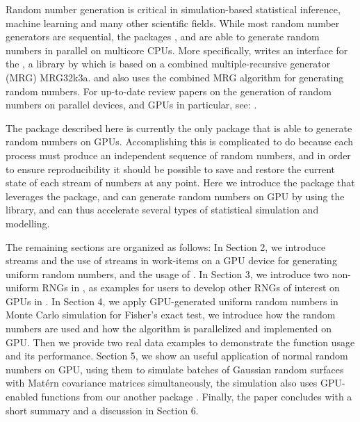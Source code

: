 \documentclass[article,nojss]{jss}\usepackage[]{graphicx}\usepackage[]{color}
\newcommand{\fct}[1]{\code{#1()}}
\begin{document}
Random number generation is critical in simulation-based statistical inference, machine learning and many other scientific fields. While most random number generators are sequential, the  packages ,  \citep*{future1.19.1} and  \citep{sevcikova2015package} are able to generate random numbers in parallel on multicore CPUs. More specifically,  writes an interface for the , a  library by \cite{l2002object} which is based on a combined multiple-recursive generator (MRG) MRG32k3a.  and  also uses the combined MRG algorithm for generating random numbers. For up-to-date review papers on the generation of random numbers on parallel devices, and GPUs in particular, see:  \cite{rLEC15a,rLEC17p,rLEC21a}.


The  package described here is currently the only  package that is able to generate random numbers on GPUs. Accomplishing this is complicated to do because each process must produce an independent sequence of random numbers, and in order to ensure reproducibility it should be possible to save and restore the current state of each stream of numbers at any point.  Here we introduce the  package  that leverages the  package, and can generate random numbers on GPU by using the  \citep{l2015clrng} library, and can thus accelerate several types of statistical simulation and modelling.



The remaining sections are organized as follows:
In Section 2, we introduce streams and the use of streams in work-items on a GPU device for generating uniform random numbers, and the usage of \fct{clrng::runif}.
In Section 3, we introduce two non-uniform RNGs in , as examples for users to develop other RNGs of interest on GPUs in .
In Section 4, we apply GPU-generated uniform random numbers in Monte Carlo simulation for Fisher’s exact test, we introduce how the random numbers are used and how the algorithm is parallelized and implemented on GPU. Then we provide two real data examples to demonstrate the function usage and its  performance.
Section 5, we show an useful application of normal random numbers on GPU, using them to simulate batches of Gaussian random surfaces with Mat\'ern covariance matrices simultaneously, the simulation also uses GPU-enabled functions from our another package .
Finally, the paper concludes with a short summary and a discussion in Section 6.
\end{document}

